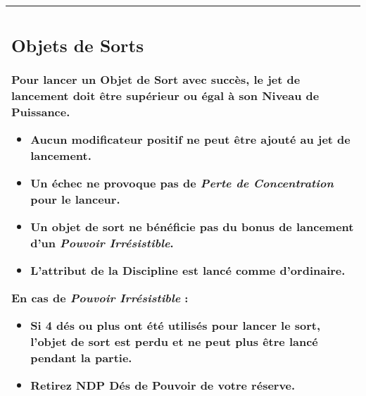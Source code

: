 \documentclass[a4paper,8pt]{extarticle}
\begin{document}
\begin{minipage}[t]{.5\linewidth}
\bigskip

\begin{tabular}{|m{8cm}|}
\hline
\vspace*{-0.4cm}
\subsection*{Objets de Sorts}
\noindent Pour lancer un Objet de Sort avec succès, le jet de lancement doit être supérieur ou égal à son Niveau de Puissance.
\smallskip
\begin{itemize}
\item Aucun modificateur positif ne peut être ajouté au jet de lancement.
\item Un échec ne provoque pas de \emph{Perte de Concentration} pour le lanceur.
\item Un objet de sort ne bénéficie pas du bonus de lancement d'un \emph{Pouvoir Irrésistible}.
\item L'attribut de la Discipline est lancé comme d'ordinaire.
\end{itemize}
\medskip En cas de \emph{Pouvoir Irrésistible} :
\smallskip
\begin{itemize}
\item Si 4 dés ou plus ont été utilisés pour lancer le sort, l'objet de sort est perdu et ne peut plus être lancé pendant la partie.
\item Retirez NDP Dés de Pouvoir de votre réserve.
\end{itemize}
\tabularnewline
\hline
\end{tabular}

\end{minipage}
\end{document}
